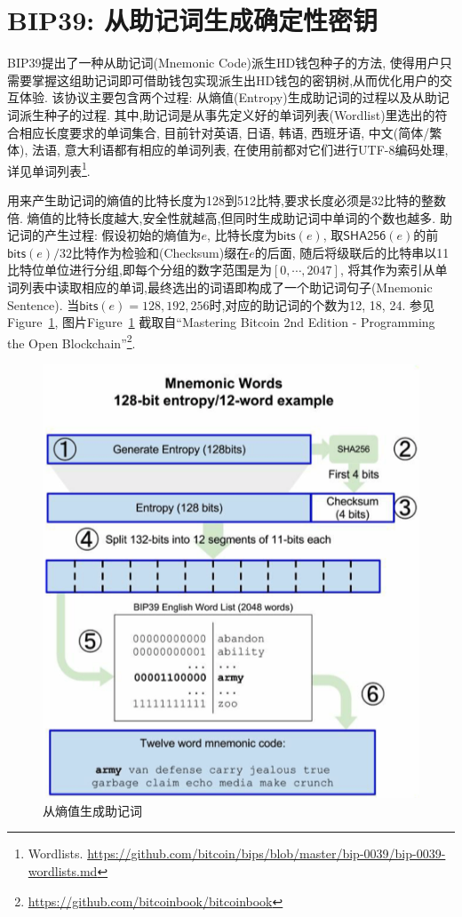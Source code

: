\section{BIP39: 从助记词生成确定性密钥}

BIP39提出了一种从助记词(Mnemonic Code)派生HD钱包种子的方法,
使得用户只需要掌握这组助记词即可借助钱包实现派生出HD钱包的密钥树,从而优化用户的交互体验.  
该协议主要包含两个过程: 从熵值(Entropy)生成助记词的过程以及从助记词派生种子的过程.
其中,助记词是从事先定义好的单词列表(Wordlist)里选出的符合相应长度要求的单词集合,
目前针对英语, 日语, 韩语, 西班牙语, 中文(简体/繁体), 法语, 意大利语都有相应的单词列表,
在使用前都对它们进行UTF-8编码处理,详见单词列表\footnote{Wordlists. 
\url{https://github.com/bitcoin/bips/blob/master/bip-0039/bip-0039-wordlists.md}}.

用来产生助记词的熵值的比特长度为128到512比特,要求长度必须是32比特的整数倍.
熵值的比特长度越大,安全性就越高,但同时生成助记词中单词的个数也越多.
助记词的产生过程: 假设初始的熵值为$e$, 比特长度为$\textsf{bits}(e)$,
取$\textsf{SHA256}(e)$的前$\textsf{bits}(e)/32$比特作为检验和(Checksum)缀在$e$的后面,
随后将级联后的比特串以11比特位单位进行分组,即每个分组的数字范围是为$[0,\cdots,2047]$,
将其作为索引从单词列表中读取相应的单词,最终选出的词语即构成了一个助记词句子(Mnemonic Sentence).
当$\textsf{bits}(e)=128,192,256$时,对应的助记词的个数为12, 18, 24.
参见Figure~\ref{fig-entropy2mnemonic}, 图片Figure~\ref{fig-entropy2mnemonic}
截取自``Mastering Bitcoin 2nd Edition - Programming the Open Blockchain''\footnote{
\url{https://github.com/bitcoinbook/bitcoinbook}}.

\begin{figure}[h]
\centering
\includegraphics[width=.5\textwidth]{./entropy2mnemonic.png}
\caption{从熵值生成助记词}\label{fig-entropy2mnemonic}
\end{figure}

